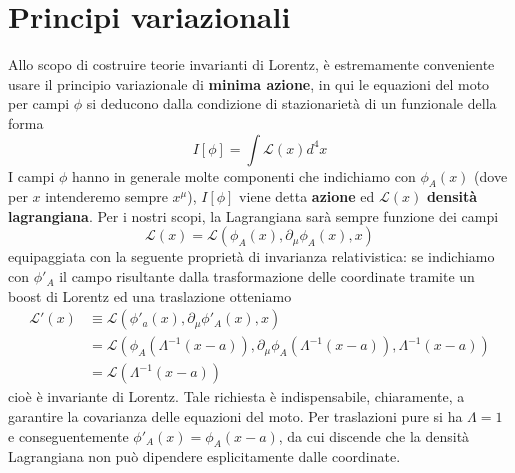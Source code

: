 \documentclass[a4paper,11pt]{book}
\theoremstyle{plain}
\theoremstyle{definition}
\begin{document}
\chapter{Principi variazionali}
Allo scopo di costruire teorie invarianti di Lorentz, è estremamente conveniente usare il principio variazionale di \textbf{minima azione}, in qui le equazioni del moto per campi $\phi$ si deducono dalla condizione di stazionarietà di un funzionale della forma
\begin{equation}
I[\phi] = \int \mathcal{L}(x)d^4x
\end{equation}
I campi $\phi$ hanno in generale molte componenti che indichiamo con $\phi_A(x)$ (dove per $x$ intenderemo sempre $x^{\mu}$), $I[\phi]$ viene detta \textbf{azione} ed $\mathcal{L}(x)$ \textbf{densità lagrangiana}. Per i nostri scopi, la Lagrangiana sarà sempre funzione dei campi
\[
\mathcal{L}(x) = \mathcal{L}(\phi_A(x), \partial_{\mu}\phi_A(x),x)
\]
equipaggiata con la seguente proprietà di invarianza relativistica: se indichiamo con $\phi'_A$ il campo risultante dalla trasformazione delle coordinate tramite un boost di Lorentz ed una traslazione otteniamo
\begin{align*}
\mathcal{L}'(x) &\equiv \mathcal{L}(\phi'_a(x), \partial_{\mu}\phi'_A(x), x) \\
&= \mathcal{L}(\phi_A(\Lambda^{-1}(x-a)), \partial_{\mu}\phi_A(\Lambda^{-1}(x-a)), \Lambda^{-1}(x-a)) \\ &= \mathcal{L}(\Lambda^{-1}(x-a))
\end{align*}
cioè è invariante di Lorentz. Tale richiesta è indispensabile, chiaramente, a garantire la covarianza delle equazioni del moto. Per traslazioni pure si ha $\Lambda=1$ e conseguentemente $\phi'_A(x) = \phi_A(x-a)$, da cui discende che la densità Lagrangiana non può dipendere esplicitamente dalle coordinate. 
\end{document}
